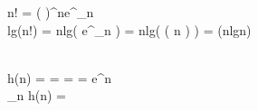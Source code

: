 \because n! = \left (  \right )^{n}e^{\alpha _{n}} \\
\therefore lg(n!) = nlg\left ( \cdot {} \cdot e^{\alpha_{n}}  \right) = nlg\left ( \Theta \left ( n \right ) \right ) = \Theta (nlgn)


\\
h(n) =  =  =  = e^{n} \\
\lim_{n \to \infty }h(n) = \infty 
